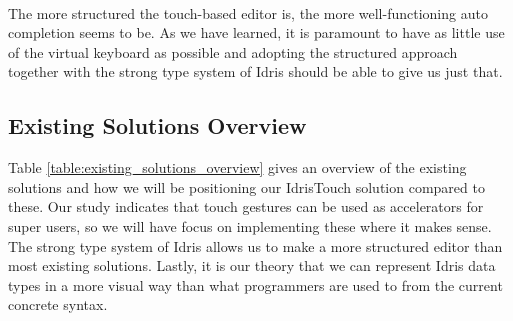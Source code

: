 \paragraph{}

The more structured the touch-based editor is, the more well-functioning auto completion seems to be. As we have learned, it is paramount to have as little use of the virtual keyboard as possible and adopting the structured approach together with the strong type system of Idris should be able to give us just that.

\subsection{Existing Solutions Overview}
Table \ref{table:existing_solutions_overview} gives an overview of the existing solutions and how we will be positioning our IdrisTouch solution compared to these. Our study indicates that touch gestures can be used as accelerators for super users, so we will have focus on implementing these where it makes sense. The strong type system of Idris allows us to make a more structured editor than most existing solutions. Lastly, it is our theory that we can represent Idris data types in a more visual way than what programmers are used to from the current concrete syntax.
	
